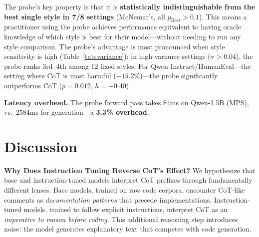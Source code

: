\documentclass[11pt]{article}
\begin{document}
\begin{table}[t]
    \centering
    \caption{\textbf{Style sensitivity ($\sigma$) and probe ranking.} $\sigma$ = std.\ dev.\ of Pass@1 across 12 styles. Rank = probe placement among 12 fixed styles.}
    \label{tab:variance}
    \small
\end{table}

The probe's key property is that it is \textbf{statistically indistinguishable from the best single style in 7/8 settings} (McNemar's, all $p_{\text{Best}} > 0.1$). This means a practitioner using the probe achieves performance equivalent to having oracle knowledge of which style is best for their model---without needing to run any style comparison. The probe's advantage is most pronounced when style sensitivity is high (Table~\ref{tab:variance}): in high-variance settings ($\sigma > 0.04$), the probe ranks 3rd--4th among 12 fixed styles. For Qwen Instruct/HumanEval---the setting where CoT is most harmful ($-15.2\%$)---the probe significantly outperforms CoT ($p=0.012$, $h=+0.40$).

\textbf{Latency overhead.} The probe forward pass takes 84ms on Qwen-1.5B (MPS), vs.\ 2584ms for generation---a \textbf{3.3\% overhead}.

\section{Discussion}

\textbf{Why Does Instruction Tuning Reverse CoT's Effect?} We hypothesize that base and instruction-tuned models interpret CoT prefixes through fundamentally different lenses. Base models, trained on raw code corpora, encounter CoT-like comments as \emph{documentation patterns} that precede implementations. Instruction-tuned models, trained to follow explicit instructions, interpret CoT as an \emph{imperative to reason before coding}. This additional reasoning step introduces noise: the model generates explanatory text that competes with code generation.
\end{document}
